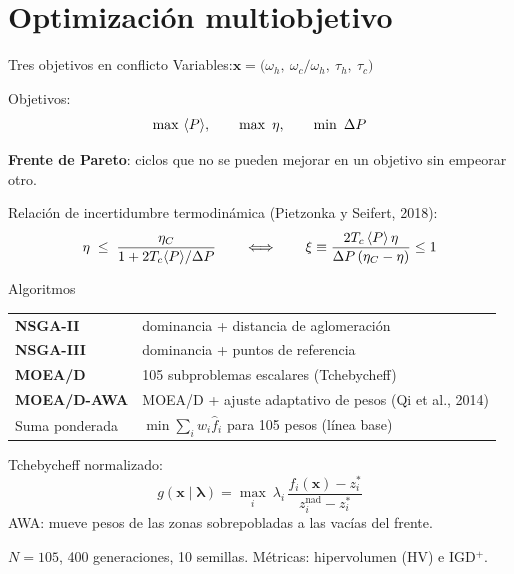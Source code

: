 \section{Optimización multiobjetivo}

\begin{frame}{Tres objetivos en conflicto}
    Variables:\quad $\mathbf{x} = \big(\omega_h,\ \omega_c/\omega_h,\ \tau_h,\ \tau_c\big)$

    \vspace{6pt}
    Objetivos:
    \[
        \max\ \avg{P},\qquad \max\ \eta,\qquad \min\ \dP
    \]

    \vspace{2pt}
    \textbf{Frente de Pareto}: ciclos que no se pueden mejorar en un objetivo sin empeorar otro.

    \vspace{8pt}
    Relación de incertidumbre termodinámica (Pietzonka y Seifert, 2018):
    \[
        \eta \;\leq\; \frac{\eta_C}{1 + 2 T_c \langle P \rangle/\Delta P}
        \qquad\Longleftrightarrow\qquad
        \xi \equiv \frac{2T_c\,\langle P \rangle\,\eta}{\Delta P\,(\eta_C - \eta)} \leq 1
    \]
\end{frame}

\begin{frame}{Algoritmos}
    \begin{tabular}{@{}ll@{}}
        \toprule
        \textbf{NSGA-II} & dominancia + distancia de aglomeración \\
        \textbf{NSGA-III} & dominancia + puntos de referencia \\
        \textbf{MOEA/D} & 105 subproblemas escalares (Tchebycheff) \\
        \textbf{MOEA/D-AWA} & MOEA/D + ajuste adaptativo de pesos (Qi et al., 2014) \\
        Suma ponderada & $\min \sum_i w_i \hat f_i$ para 105 pesos (línea base) \\
        \bottomrule
    \end{tabular}

    \vspace{10pt}
    Tchebycheff normalizado:
    \[
        g(\mathbf{x}\mid\boldsymbol\lambda) = \max_i\ \lambda_i\,\frac{f_i(\mathbf{x}) - z_i^*}{z_i^{\text{nad}} - z_i^*}
    \]
    AWA: mueve pesos de las zonas sobrepobladas a las vacías del frente.

    \vspace{6pt}
    {\small $N=105$, 400 generaciones, 10 semillas. Métricas: hipervolumen (HV) e IGD$^+$.}
\end{frame}
